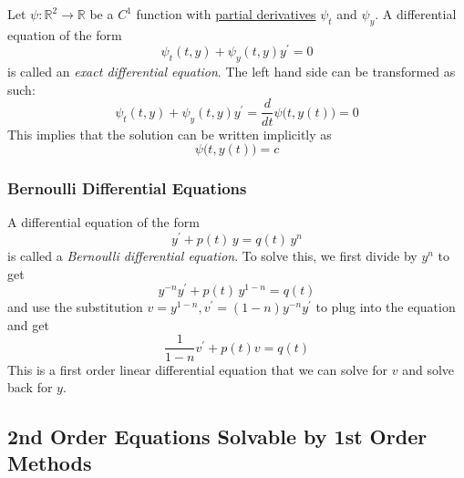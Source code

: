 \documentclass{article}
\newcounter{definition}[section]
\begin{document}
      \begin{definition}
        \label{def:exact-deqs-and-solutions}
      Let $\psi: \mathbb{R}^2 \to \mathbb{R}$ be a $C^1$ function with \hyperref[mv-def:partial-derivative]{partial derivatives} $\psi_t$ and $\psi_y$. A differential equation of the form 
      \begin{equation}
        \psi_t (t, y) + \psi_y (t, y) y^\prime = 0
      \end{equation}
      is called an \textit{exact differential equation}. The left hand side can be transformed as such: 
      \begin{equation}
        \psi_t (t, y) + \psi_y (t, y) y^\prime = \frac{d}{dt} \psi \big( t, y(t)\big) = 0
      \end{equation}
      This implies that the solution can be written implicitly as 
      \begin{equation}
        \psi \big(t, y(t)\big) = c
      \end{equation}
      \end{definition}

    \subsubsection{Bernoulli Differential Equations}

      \begin{definition}
        \label{def:bernoulli-deqs-and-solutions}
      A differential equation of the form 
      \begin{equation}
        y^\prime + p(t)\,y = q(t)\, y^{n}
      \end{equation}
      is called a \textit{Bernoulli differential equation}. To solve this, we first divide by $y^n$ to get
      \begin{equation}
        y^{-n} y^\prime + p(t)\,y^{1-n} = q(t)
      \end{equation}
      and use the substitution $v = y^{1-n}, v^\prime = (1-n)y^{-n} y^\prime$ to plug into the equation and get
      \begin{equation}
        \frac{1}{1-n} v^\prime + p(t) v = q(t)
      \end{equation}
      This is a first order linear differential equation that we can solve for $v$ and solve back for $y$. 
      \end{definition}

  \subsection{2nd Order Equations Solvable by 1st Order Methods}
\end{document}
